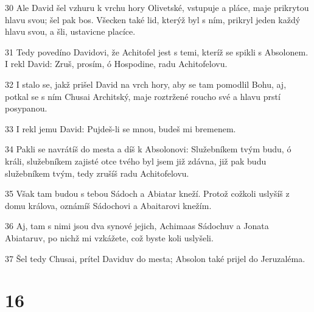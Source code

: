 \par 30 Ale David šel vzhuru k vrchu hory Olivetské, vstupuje a pláce, maje prikrytou hlavu svou; šel pak bos. Všecken také lid, kterýž byl s ním, prikryl jeden každý hlavu svou, a šli, ustavicne placíce.
\par 31 Tedy povedíno Davidovi, že Achitofel jest s temi, kteríž se spikli s Absolonem. I rekl David: Zruš, prosím, ó Hospodine, radu Achitofelovu.
\par 32 I stalo se, jakž prišel David na vrch hory, aby se tam pomodlil Bohu, aj, potkal se s ním Chusai Architský, maje roztržené roucho své a hlavu prstí posypanou.
\par 33 I rekl jemu David: Pujdeš-li se mnou, budeš mi bremenem.
\par 34 Pakli se navrátíš do mesta a díš k Absolonovi: Služebníkem tvým budu, ó králi, služebníkem zajisté otce tvého byl jsem již zdávna, již pak budu služebníkem tvým, tedy zrušíš radu Achitofelovu.
\par 35 Však tam budou s tebou Sádoch a Abiatar kneží. Protož cožkoli uslyšíš z domu králova, oznámíš Sádochovi a Abaitarovi knežím.
\par 36 Aj, tam s nimi jsou dva synové jejich, Achimaas Sádochuv a Jonata Abiataruv, po nichž mi vzkážete, což byste koli uslyšeli.
\par 37 Šel tedy Chusai, prítel Daviduv do mesta; Absolon také prijel do Jeruzaléma.

\chapter{16}

